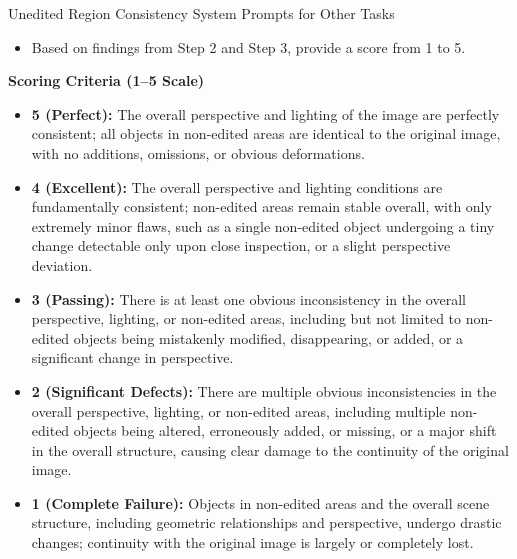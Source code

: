 \begin{promptbox}[label={System Prompts: URC_Other_Tasks}]{Unedited Region Consistency System Prompts for Other Tasks}
\begin{itemize}[leftmargin=2.2em, labelsep=0.5em, itemsep=2pt]
    \begin{itemize}[leftmargin=2.2em, labelsep=0.5em, itemsep=2pt]
        \item \textbf{Spatial Structure Consistency:} Apart from the instruction's requirements, have the positions of objects changed?
        
        \item \textbf{Viewpoint Consistency:} Check if the view or angle of the Edited Image remains consistent.
    \end{itemize}
    
    \item Based on findings from Step 2 and Step 3, provide a score from 1 to 5.
\end{itemize}

\medskip

\textbf{Scoring Criteria (1--5 Scale)}

\begin{itemize}[leftmargin=2.2em, labelsep=0.5em, itemsep=2pt]
    \item \textbf{5 (Perfect):} The overall perspective and lighting of the image are perfectly consistent; all objects in non-edited areas are identical to the original image, with no additions, omissions, or obvious deformations.
    
    \item \textbf{4 (Excellent):} The overall perspective and lighting conditions are fundamentally consistent; non-edited areas remain stable overall, with only extremely minor flaws, such as a single non-edited object undergoing a tiny change detectable only upon close inspection, or a slight perspective deviation.
    
    \item \textbf{3 (Passing):} There is at least one obvious inconsistency in the overall perspective, lighting, or non-edited areas, including but not limited to non-edited objects being mistakenly modified, disappearing, or added, or a significant change in perspective.
    
    \item \textbf{2 (Significant Defects):} There are multiple obvious inconsistencies in the overall perspective, lighting, or non-edited areas, including multiple non-edited objects being altered, erroneously added, or missing, or a major shift in the overall structure, causing clear damage to the continuity of the original image.
    
    \item \textbf{1 (Complete Failure):} Objects in non-edited areas and the overall scene structure, including geometric relationships and perspective, undergo drastic changes; continuity with the original image is largely or completely lost.
\end{itemize}


\end{promptbox}
